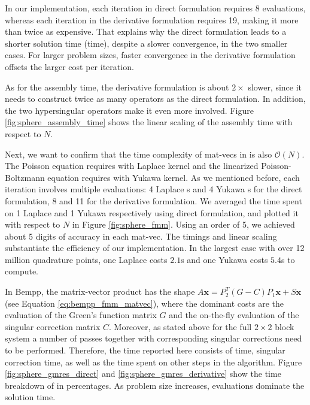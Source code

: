 In our implementation, each iteration in direct formulation requires $8$ \fmm evaluations, whereas each iteration in the derivative formulation requires 19, making it more than twice as expensive.
That explains why the direct formulation leads to a shorter solution time (\gmres time), despite a slower convergence, in the two smaller cases.
For larger problem sizes, faster convergence in the derivative formulation offsets the larger cost per iteration.

As for the assembly time, the derivative formulation is about $2\times$ slower, since it needs to construct twice as many operators as the direct formulation.
In addition, the two hypersingular operators make it even more involved.
Figure \ref{fig:sphere_assembly_time} shows the linear scaling of the assembly time with respect to $N$.

Next, we want to confirm that the time complexity of mat-vecs in \gmres is also $\mathcal{O}(N)$.
The Poisson equation requires \fmm with Laplace kernel and the linearized Poisson-Boltzmann equation requires \fmm with Yukawa kernel.
As we mentioned before, each iteration involves multiple \fmm evaluations: 4 Laplace {\fmm}s and 4 Yukawa {\fmm}s for the direct formulation, 8 and 11 for the derivative formulation.
We averaged the time spent on 1 Laplace \fmm and 1 Yukawa \fmm respectively using direct formulation, and plotted it with respect to $N$ in Figure \ref{fig:sphere_fmm}.
Using an \fmm order of 5, we achieved about 5 digits of accuracy in each mat-vec.
The timings and linear scaling substantiate the efficiency of our \fmm implementation.
In the largest case with over 12 million quadrature points, one Laplace \fmm costs $2.1$s and one Yukawa \fmm costs $5.4$s to compute.

In Bempp, the matrix-vector product has the shape $A\mathbf{x} = P_2^T (G - C)P_1 \mathbf{x} + S \mathbf{x}$ (see Equation \ref{eq:bempp_fmm_matvec}), where the dominant costs are the \fmm evaluation of the Green's function matrix $G$ and the on-the-fly evaluation of the singular correction matrix $C$. Moreover, as stated above for the full $2\times 2$ block system a number of \fmm passes together with corresponding singular corrections need to be performed.
Therefore, the \gmres time reported here consists of \fmm time, singular correction time, as well as the time spent on other steps in the \gmres algorithm.
Figure \ref{fig:sphere_gmres_direct} and \ref{fig:sphere_gmres_derivative} show the time breakdown of \gmres in percentages.
As problem size increases, \fmm evaluations dominate the solution time.

